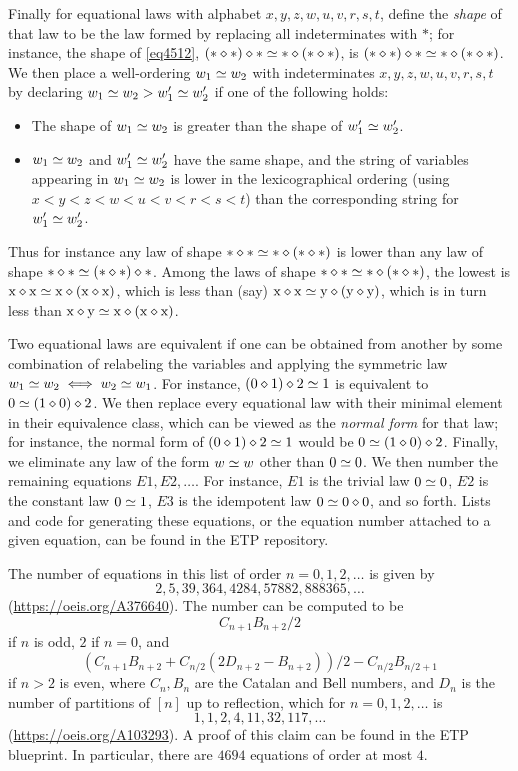 Finally for equational laws with alphabet $x,y,z,w,u,v,r,s,t$, define the \emph{shape} of that law to be the law formed by replacing all indeterminates with $\ast$; for instance, the shape of \eqref{eq4512}, $(\ast \diamond \ast) \diamond \ast \simeq \ast \diamond (\ast \diamond \ast)$, is $(\ast \diamond \ast) \diamond \ast \simeq \ast \diamond (\ast \diamond \ast)$.  We then place a well-ordering $w_1 \simeq w_2$ with indeterminates $x,y,z,w,u,v,r,s,t$ by declaring $w_1 \simeq w_2 > w'_1 \simeq w'_2$ if one of the following holds:
\begin{itemize}
\item The shape of $w_1 \simeq w_2$ is greater than the shape of $w'_1 \simeq w'_2$.
\item $w_1 \simeq w_2$ and $w'_1 \simeq w'_2$ have the same shape, and the string of variables appearing in $w_1 \simeq w_2$ is lower in the lexicographical ordering (using $x < y < z < w < u < v < r < s < t$) than the corresponding string for $w'_1 \simeq w'_2$.
\end{itemize}
Thus for instance any law of shape $\ast \diamond \ast \simeq \ast \diamond (\ast \diamond \ast)$ is lower than any law of shape
$\ast \diamond \ast \simeq (\ast \diamond \ast) \diamond \ast$.  Among the laws of shape $\ast \diamond \ast \simeq \ast \diamond (\ast \diamond \ast)$, the lowest is $\mathrm{x} \diamond \mathrm{x} \simeq \mathrm{x} \diamond (\mathrm{x} \diamond \mathrm{x})$, which is less than (say) $\mathrm{x} \diamond \mathrm{x} \simeq \mathrm{y} \diamond (\mathrm{y} \diamond \mathrm{y})$, which is in turn less than $\mathrm{x} \diamond \mathrm{y} \simeq \mathrm{x} \diamond (\mathrm{x} \diamond \mathrm{x})$.

Two equational laws are equivalent if one can be obtained from another by some combination of relabeling the variables and applying the symmetric law $w_1 \simeq w_2 \iff w_2 \simeq w_1$.  For instance, $(0 \diamond 1) \diamond 2 \simeq 1$ is equivalent to $0 \simeq (1 \diamond 0) \diamond 2$.  We then replace every equational law with their minimal element in their equivalence class, which can be viewed as the \emph{normal form} for that law; for instance, the normal form of $(0 \diamond 1) \diamond 2 \simeq 1$ would be $0 \simeq (1 \diamond 0) \diamond 2$.  Finally, we eliminate any law of the form $w \simeq w$ other than $0 \simeq 0$.  We then number the remaining equations $E1, E2, \dots$.  For instance, $E1$ is the trivial law $0 \simeq 0$, $E2$ is the constant law $0 \simeq 1$, $E3$ is the idempotent law $0 \simeq 0 \diamond 0$, and so forth.  Lists and code for generating these equations, or the equation number attached to a given equation, can be found in the ETP repository.

The number of equations in this list of order $n=0,1,2,\dots$ is given by
$$ 2, 5, 39, 364, 4284, 57882, 888365, \dots$$
(\url{https://oeis.org/A376640}).  The number can be computed to be
$$ C_{n+1} B_{n+2}/2$$
if $n$ is odd, $2$ if $n=0$, and
$$ (C_{n+1} B_{n+2}+ C_{n/2}(2D_{n+2}-B_{n+2}))/2 - C_{n/2} B_{n/2+1}$$
if $n > 2$ is even, where $C_n, B_n$ are the Catalan and Bell numbers, and $D_n$ is the number of partitions of $[n]$ up to reflection, which for $n=0,1,2,\dots$ is
$$ 1, 1, 2, 4, 11, 32, 117, \dots$$
(\url{https://oeis.org/A103293}).  A proof of this claim can be found in the ETP blueprint.  In particular, there are $4694$ equations of order at most $4$.

